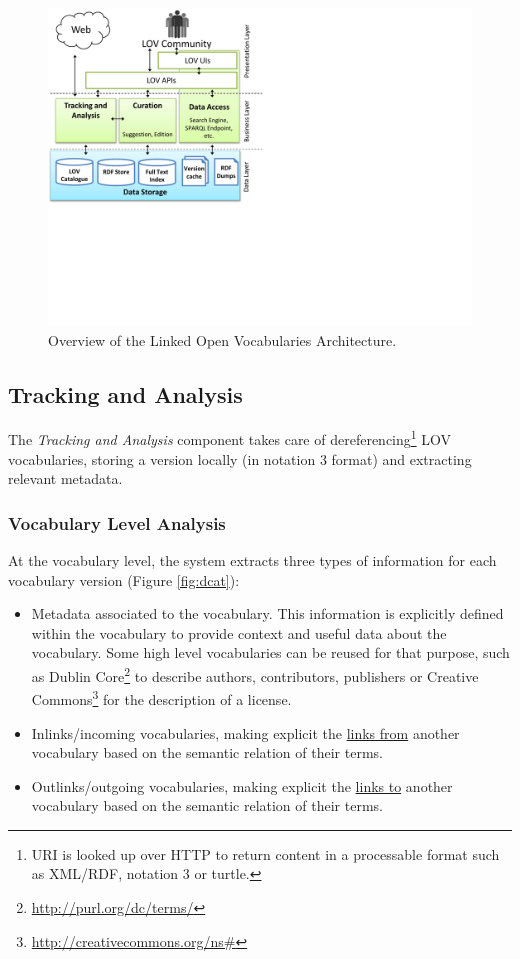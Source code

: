 \documentclass{iosart2c}
\begin{document}
\begin{figure}[ht!b]
\includegraphics[trim={0cm 7cm 0cm 0cm},scale=.6]{lov_architecture.pdf}
\caption{Overview of the Linked Open Vocabularies Architecture.}
\label{fig:arch}
\end{figure}

\subsection{Tracking and Analysis}
	The \emph{Tracking and Analysis} component takes care of dereferencing\footnote{URI is looked up over HTTP to return content in a processable format such as XML/RDF, notation 3 or turtle.} LOV vocabularies, storing a version locally (in notation 3 format) and extracting relevant metadata.

\subsubsection{Vocabulary Level Analysis}\label{sec:vocabLevelAnalysis}
At the vocabulary level, the system extracts three types of information for each vocabulary version (Figure \ref{fig:dcat}):
\begin{itemize}
\item Metadata associated to the vocabulary. This information is explicitly defined within the vocabulary to provide context and useful data about the vocabulary. Some high level vocabularies can be reused for that purpose, such as Dublin Core\footnote{\url{http://purl.org/dc/terms/}} to describe authors, contributors, publishers or Creative Commons\footnote{\url{http://creativecommons.org/ns\#}} for the description of a license.

\item Inlinks/incoming vocabularies, making explicit the \underline{links from} another vocabulary based on the semantic relation of their terms.

\item Outlinks/outgoing vocabularies, making explicit the \underline{links to} another vocabulary based on the semantic relation of their terms.
\end{itemize}
\end{document}
